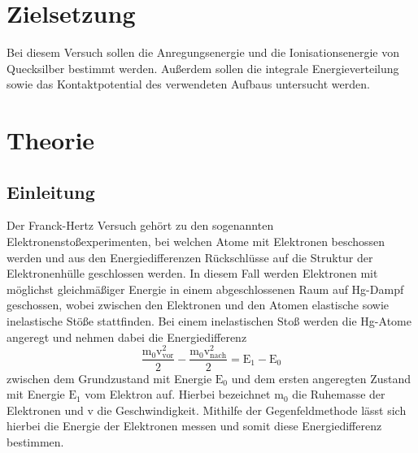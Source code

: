 \section{Zielsetzung}
Bei diesem Versuch sollen die Anregungsenergie und die Ionisationsenergie von
Quecksilber bestimmt werden. Außerdem sollen die integrale Energieverteilung sowie das Kontaktpotential des verwendeten
Aufbaus untersucht werden.

\section{Theorie}
\subsection{Einleitung}

Der Franck-Hertz Versuch gehört zu den sogenannten Elektronenstoßexperimenten, bei welchen
Atome mit Elektronen beschossen werden und aus den Energiedifferenzen Rückschlüsse auf
die Struktur der Elektronenhülle geschlossen werden.
In diesem Fall werden Elektronen mit möglichst gleichmäßiger Energie in einem abgeschlossenen
Raum auf Hg-Dampf geschossen, wobei zwischen den Elektronen und den Atomen elastische
sowie inelastische Stöße stattfinden.
Bei einem inelastischen Stoß werden die Hg-Atome angeregt und nehmen dabei die Energiedifferenz
\begin{equation}
  \frac{\text{m}_0 \text{v}^2_{\text{vor}}}{2} - \frac{\text{m}_0 \text{v}^2_{\text{nach}}}{2} = \text{E}_1 -\text{E}_0
  \label{eqn:Edif}
\end{equation}
zwischen dem Grundzustand mit Energie $\text{E}_0$ und dem ersten angeregten Zustand mit Energie
$\text{E}_1$ vom Elektron auf. Hierbei bezeichnet $\text{m}_0$ die Ruhemasse der Elektronen
und $\text{v}$ die Geschwindigkeit.
Mithilfe der Gegenfeldmethode lässt sich hierbei die Energie der Elektronen messen und
somit diese Energiedifferenz bestimmen.



